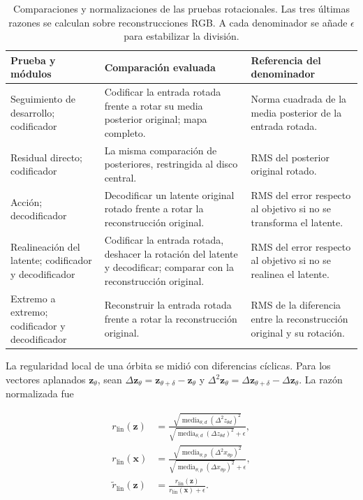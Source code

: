 \enlargethispage{\baselineskip}
\begin{table}[htbp]
    \centering
    \small
    \begin{tabularx}{\textwidth}{@{}p{}XX@{}}
    \toprule
    Prueba y módulos & Comparación evaluada & Referencia del denominador \\
    \midrule
    Seguimiento de desarrollo; codificador &
    Codificar la entrada rotada frente a rotar su media posterior original;
    mapa completo. &
    Norma cuadrada de la media posterior de la entrada rotada. \\
    \addlinespace
    Residual directo; codificador &
    La misma comparación de posteriores, restringida al disco central. &
    RMS del posterior original rotado. \\
    \addlinespace
    Acción; decodificador &
    Decodificar un latente original rotado frente a rotar la reconstrucción
    original. &
    RMS del error respecto al objetivo si no se transforma el latente. \\
    \addlinespace
    Realineación del latente; codificador y decodificador &
    Codificar la entrada rotada, deshacer la rotación del latente y decodificar;
    comparar con la reconstrucción original. &
    RMS del error respecto al objetivo si no se realinea el latente. \\
    \addlinespace
    Extremo a extremo; codificador y decodificador &
    Reconstruir la entrada rotada frente a rotar la reconstrucción original. &
    RMS de la diferencia entre la reconstrucción original y su rotación. \\
    \bottomrule
    \end{tabularx}
    \caption{Comparaciones y normalizaciones de las pruebas rotacionales. Las
    tres últimas razones se calculan sobre reconstrucciones RGB. A cada
    denominador se añade \(\epsilon\) para estabilizar la división.}
    \label{tab:pruebas-rotacionales}
\end{table}

La regularidad local de una órbita se midió con diferencias cíclicas. Para los
vectores aplanados \(\mathbf z_\theta\), sean
\(\Delta\mathbf z_\theta=\mathbf z_{\theta+\delta}-\mathbf z_\theta\) y
\(\Delta^2\mathbf z_\theta=\Delta\mathbf z_{\theta+\delta}
-\Delta\mathbf z_\theta\). La razón normalizada fue

\begin{equation}
\begin{aligned}
    r_{\mathrm{lin}}(\mathbf z)
      &=\frac{\sqrt{\operatorname{media}_{\theta,d}
          (\Delta^2 z_{\theta d})^2}}
        {\sqrt{\operatorname{media}_{\theta,d}
          (\Delta z_{\theta d})^2}+\epsilon},\\
    r_{\mathrm{lin}}(\mathbf x)
      &=\frac{\sqrt{\operatorname{media}_{\theta,p}
          (\Delta^2 x_{\theta p})^2}}
        {\sqrt{\operatorname{media}_{\theta,p}
          (\Delta x_{\theta p})^2}+\epsilon},\\
    \widetilde r_{\mathrm{lin}}(\mathbf z)
      &=\frac{r_{\mathrm{lin}}(\mathbf z)}
        {r_{\mathrm{lin}}(\mathbf x)+\epsilon}.
\end{aligned}
    \label{eq:linealidad-local-corregida}
\end{equation}

